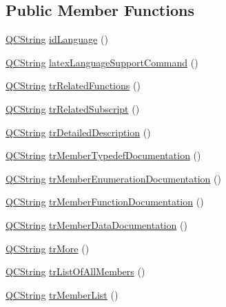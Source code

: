 \subsection*{Public Member Functions}
\begin{DoxyCompactItemize}
\item 
\mbox{\hyperlink{class_q_c_string}{Q\+C\+String}} \mbox{\hyperlink{class_translator_polish_a75c2e08b70d1be5ca4c1b6f9951def03}{id\+Language}} ()
\item 
\mbox{\hyperlink{class_q_c_string}{Q\+C\+String}} \mbox{\hyperlink{class_translator_polish_ac5c8175efc27b8661a046f601843dec9}{latex\+Language\+Support\+Command}} ()
\item 
\mbox{\hyperlink{class_q_c_string}{Q\+C\+String}} \mbox{\hyperlink{class_translator_polish_a186ac7a8f63b630d82593fc27704df18}{tr\+Related\+Functions}} ()
\item 
\mbox{\hyperlink{class_q_c_string}{Q\+C\+String}} \mbox{\hyperlink{class_translator_polish_a1da09f00d1158c62a529fb714b8a9d5e}{tr\+Related\+Subscript}} ()
\item 
\mbox{\hyperlink{class_q_c_string}{Q\+C\+String}} \mbox{\hyperlink{class_translator_polish_a2d0e5f23e20962482c7750b64af25e52}{tr\+Detailed\+Description}} ()
\item 
\mbox{\hyperlink{class_q_c_string}{Q\+C\+String}} \mbox{\hyperlink{class_translator_polish_a17b66291ed3f31b237865c8061d4fe54}{tr\+Member\+Typedef\+Documentation}} ()
\item 
\mbox{\hyperlink{class_q_c_string}{Q\+C\+String}} \mbox{\hyperlink{class_translator_polish_af2a4dd01a0158ba719c6b438cb654cc7}{tr\+Member\+Enumeration\+Documentation}} ()
\item 
\mbox{\hyperlink{class_q_c_string}{Q\+C\+String}} \mbox{\hyperlink{class_translator_polish_a3d8f160f91ae9317995c9cd3cfabb99e}{tr\+Member\+Function\+Documentation}} ()
\item 
\mbox{\hyperlink{class_q_c_string}{Q\+C\+String}} \mbox{\hyperlink{class_translator_polish_a5ec821f6b6e87f5a446ef18e492aef23}{tr\+Member\+Data\+Documentation}} ()
\item 
\mbox{\hyperlink{class_q_c_string}{Q\+C\+String}} \mbox{\hyperlink{class_translator_polish_ac5bf5b88079d6b285978bdfc679d7ddb}{tr\+More}} ()
\item 
\mbox{\hyperlink{class_q_c_string}{Q\+C\+String}} \mbox{\hyperlink{class_translator_polish_a75a43fcd1a1927285d3cf31c1525bb82}{tr\+List\+Of\+All\+Members}} ()
\item 
\mbox{\hyperlink{class_q_c_string}{Q\+C\+String}} \mbox{\hyperlink{class_translator_polish_aa79fac5e1171b2a5dab0d0464784ebff}{tr\+Member\+List}} ()

\end{DoxyCompactItemize}
